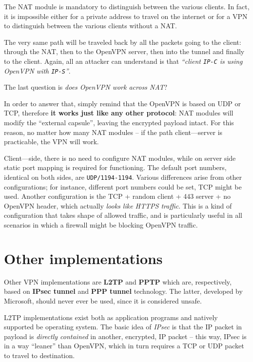 \documentclass[10pt]{extbook}
\begin{document}
The NAT module is mandatory to distinguish between the various clients. In
fact, it is impossible either for a private address to travel on the internet
or for a VPN to distinguish between the various clients without a NAT.

The very same path will be traveled back by all the packets going to the
client: through the NAT, then to the OpenVPN server, then into the tunnel and
finally to the client. Again, all an attacker can understand is that
\emph{``client \texttt{IP-C} is using OpenVPN with \texttt{IP-S}''}.

The last question is \emph{does OpenVPN work across NAT}?

In order to answer that, simply remind that the OpenVPN is based on UDP or TCP,
therefore \textbf{it works just like any other protocol}: NAT modules will
modify the ``external capsule'', leaving the encrypted payload intact. For this
reason, no matter how many NAT modules -- if the path client---server is
practicable, the VPN will work.

Client---side, there is no need to configure NAT modules, while on server side
static port mapping is required for functioning. The default port numbers,
identical on both sides, are \texttt{UDP/1194-1194}. Various differences arise
from other configurations; for instance, different port numbers could be set,
TCP might be used. Another configuration is the TCP + random client + 443
server + no OpenVPN header, which actually \emph{looks like HTTPS traffic}.
This is a kind of configuration that takes shape of allowed traffic, and is
particularly useful in all scenarios in which a firewall might be blocking
OpenVPN traffic.

\section{Other implementations}

Other VPN implementations are \textbf{L2TP} and \textbf{PPTP} which are,
respectively, based on \textbf{IPsec tunnel} and \textbf{PPP tunnel}
technology. The latter, developed by Microsoft, should never ever be used,
since it is considered unsafe.

L2TP implementations exist both as application programs and natively supported
be operating system. The basic idea of \emph{IPsec} is that the IP packet in
payload is \emph{directly contained} in another, encrypted, IP packet -- this
way, IPsec is in a way ``leaner'' than OpenVPN, which in turn requires a TCP or
UDP packet to travel to destination.
\end{document}
